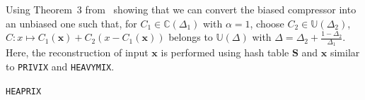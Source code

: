 \documentclass[twoside]{article}
\newtheorem{lemma}{Lemma}
\begin{document}
Using Theorem~$3$ from~\cite{horvath2020better} showing that we can convert the biased compressor into an unbiased one such that, for $C_1\in \mathbb{C}(\Delta_1)$ with $\alpha=1$, choose $C_2\in \mathbb{U}(\Delta_2)$, $C: x \mapsto C_1(\mathbf{x})+C_2\left(x-C_1\left(\mathbf{x}\right)\right)$ belongs to $\mathbb{U}(\Delta)$ with $\Delta=\Delta_2+\frac{1-\Delta_2}{\Delta_1}$.
Here, the reconstruction of input $\mathbf{x}$ is performed using hash table $\mathbf{S}$ and $\mathbf{x}$ similar to \texttt{PRIVIX} and \texttt{HEAVYMIX}.
\begin{algorithm}[H]
\caption{\texttt{HEAPRIX} }\label{alg:heaprix}
\begin{algorithmic}[1]
\end{algorithmic}
\end{algorithm}
\end{document}
